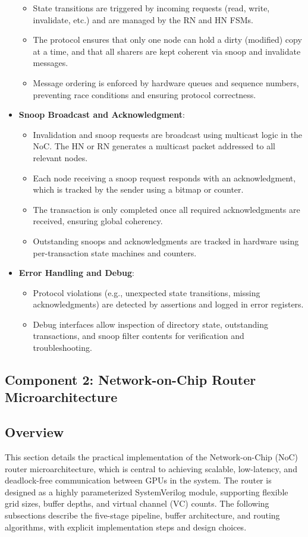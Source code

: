 \documentclass[11pt,a4paper]{article}
\begin{document}
\begin{itemize}
\begin{itemize}
        \item State transitions are triggered by incoming requests (read, write, invalidate, etc.) and are managed by the RN and HN FSMs.
        \item The protocol ensures that only one node can hold a dirty (modified) copy at a time, and that all sharers are kept coherent via snoop and invalidate messages.
        \item Message ordering is enforced by hardware queues and sequence numbers, preventing race conditions and ensuring protocol correctness.
    \end{itemize}
    \item \textbf{Snoop Broadcast and Acknowledgment}:
    \begin{itemize}
        \item Invalidation and snoop requests are broadcast using multicast logic in the NoC. The HN or RN generates a multicast packet addressed to all relevant nodes.
        \item Each node receiving a snoop request responds with an acknowledgment, which is tracked by the sender using a bitmap or counter.
        \item The transaction is only completed once all required acknowledgments are received, ensuring global coherency.
        \item Outstanding snoops and acknowledgments are tracked in hardware using per-transaction state machines and counters.
    \end{itemize}
    \item \textbf{Error Handling and Debug}:
    \begin{itemize}
        \item Protocol violations (e.g., unexpected state transitions, missing acknowledgments) are detected by assertions and logged in error registers.
        \item Debug interfaces allow inspection of directory state, outstanding transactions, and snoop filter contents for verification and troubleshooting.
    \end{itemize}
\end{itemize}

\subsection{Component 2: Network-on-Chip Router Microarchitecture}

\subsection*{Overview}
This section details the practical implementation of the Network-on-Chip (NoC) router microarchitecture, which is central to achieving scalable, low-latency, and deadlock-free communication between GPUs in the system. The router is designed as a highly parameterized SystemVerilog module, supporting flexible grid sizes, buffer depths, and virtual channel (VC) counts. The following subsections describe the five-stage pipeline, buffer architecture, and routing algorithms, with explicit implementation steps and design choices.
\end{document}
